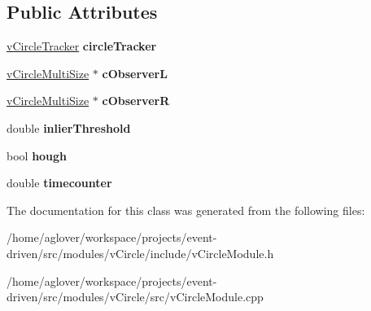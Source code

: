 \subsection*{Public Attributes}
\begin{DoxyCompactItemize}
\item 
\hyperlink{classvCircleTracker}{v\+Circle\+Tracker} {\bfseries circle\+Tracker}\hypertarget{classvCircleReader_a7b0ae9557cbe36e72339cc7479d99833}{}\label{classvCircleReader_a7b0ae9557cbe36e72339cc7479d99833}

\item 
\hyperlink{classvCircleMultiSize}{v\+Circle\+Multi\+Size} $\ast$ {\bfseries c\+ObserverL}\hypertarget{classvCircleReader_a75c47ee3024729fab391fc0098147430}{}\label{classvCircleReader_a75c47ee3024729fab391fc0098147430}

\item 
\hyperlink{classvCircleMultiSize}{v\+Circle\+Multi\+Size} $\ast$ {\bfseries c\+ObserverR}\hypertarget{classvCircleReader_a52940184b5d5f348813fdfdf1a62da48}{}\label{classvCircleReader_a52940184b5d5f348813fdfdf1a62da48}

\item 
double {\bfseries inlier\+Threshold}\hypertarget{classvCircleReader_abb1da4c345eb519b695927d12f2f1ec8}{}\label{classvCircleReader_abb1da4c345eb519b695927d12f2f1ec8}

\item 
bool {\bfseries hough}\hypertarget{classvCircleReader_a2a026b4c43ab7e721b6089b4118767a4}{}\label{classvCircleReader_a2a026b4c43ab7e721b6089b4118767a4}

\item 
double {\bfseries timecounter}\hypertarget{classvCircleReader_a0bcf9e8b5c28b2ea048ab75c4213023e}{}\label{classvCircleReader_a0bcf9e8b5c28b2ea048ab75c4213023e}

\end{DoxyCompactItemize}


The documentation for this class was generated from the following files\+:\begin{DoxyCompactItemize}
\item 
/home/aglover/workspace/projects/event-\/driven/src/modules/v\+Circle/include/v\+Circle\+Module.\+h\item 
/home/aglover/workspace/projects/event-\/driven/src/modules/v\+Circle/src/v\+Circle\+Module.\+cpp\end{DoxyCompactItemize}
